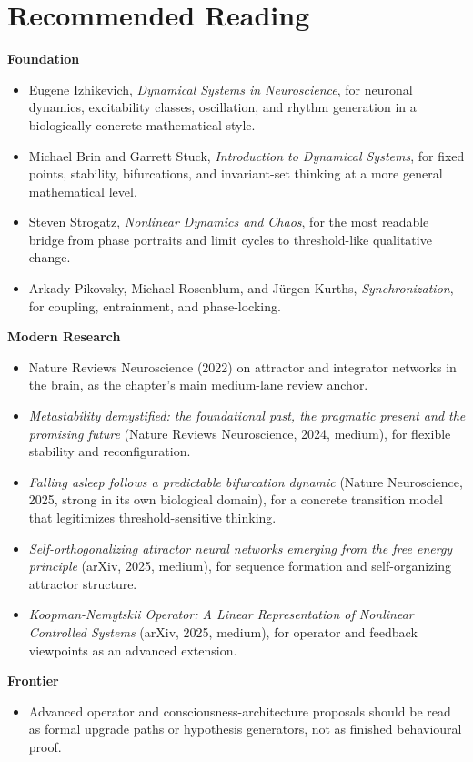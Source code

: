\section{Recommended Reading}

\begin{readingbox}
\textbf{Foundation}
\begin{itemize}[nosep]
  \item Eugene Izhikevich, \emph{Dynamical Systems in Neuroscience}, for
        neuronal dynamics, excitability classes, oscillation, and rhythm
        generation in a biologically concrete mathematical style.
  \item Michael Brin and Garrett Stuck, \emph{Introduction to Dynamical
        Systems}, for fixed points, stability, bifurcations, and invariant-set
        thinking at a more general mathematical level.
  \item Steven Strogatz, \emph{Nonlinear Dynamics and Chaos}, for the most
        readable bridge from phase portraits and limit cycles to threshold-like
        qualitative change.
  \item Arkady Pikovsky, Michael Rosenblum, and J\"urgen Kurths,
        \emph{Synchronization}, for coupling, entrainment, and phase-locking.
\end{itemize}
\textbf{Modern Research}
\begin{itemize}[nosep]
  \item Nature Reviews Neuroscience (2022) on attractor and integrator
        networks in the brain, as the chapter's main medium-lane review anchor.
  \item \emph{Metastability demystified: the foundational past, the pragmatic
        present and the promising future} (Nature Reviews Neuroscience, 2024,
        medium), for flexible stability and reconfiguration.
  \item \emph{Falling asleep follows a predictable bifurcation dynamic}
        (Nature Neuroscience, 2025, strong in its own biological domain), for
        a concrete transition model that legitimizes threshold-sensitive
        thinking.
  \item \emph{Self-orthogonalizing attractor neural networks emerging from the
        free energy principle} (arXiv, 2025, medium), for sequence formation
        and self-organizing attractor structure.
  \item \emph{Koopman-Nemytskii Operator: A Linear Representation of Nonlinear
        Controlled Systems} (arXiv, 2025, medium), for operator and feedback
        viewpoints as an advanced extension.
\end{itemize}
\textbf{Frontier}
\begin{itemize}[nosep]
  \item Advanced operator and consciousness-architecture proposals should be
        read as formal upgrade paths or hypothesis generators, not as finished
        behavioural proof.
\end{itemize}
\end{readingbox}

